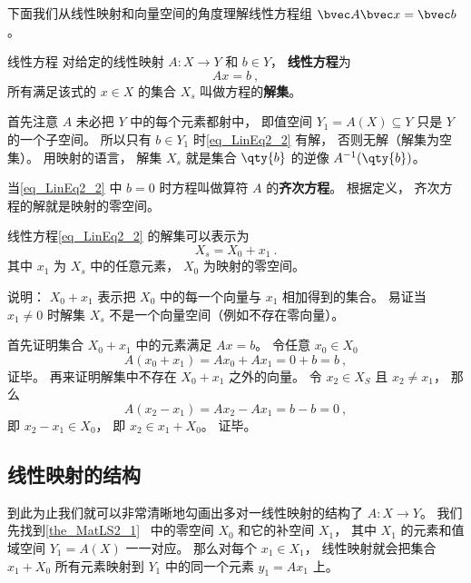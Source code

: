 
\begin{issues}
\issueDraft
\end{issues}


下面我们从线性映射和向量空间的角度理解线性方程组 $\bvec A \bvec x = \bvec b$。


\begin{definition}{线性方程}
对给定的线性映射 $A:X\to Y$ 和 $b \in Y$， \textbf{线性方程}为
\begin{equation}\label{eq_LinEq2_2}
Ax = b~,
\end{equation}
所有满足该式的 $x \in X$ 的集合 $X_s$ 叫做方程的\textbf{解集}。
\end{definition}

首先注意 $A$ 未必把 $Y$ 中的每个元素都射中， 即值空间 $Y_1 = A(X) \subseteq Y$ 只是 $Y$ 的一个子空间。 所以只有 $b \in Y_1$ 时\autoref{eq_LinEq2_2} 有解， 否则无解（解集为空集）。 用映射的语言， 解集 $X_s$ 就是集合 $\qty{b}$ 的逆像 $A^{-1}(\qty{b})$。

当\autoref{eq_LinEq2_2} 中 $b = 0$ 时方程叫做算符 $A$ 的\textbf{齐次方程}。 根据定义， 齐次方程的解就是映射的零空间。


\begin{theorem}{}\label{the_LinEq2_1}
线性方程\autoref{eq_LinEq2_2} 的解集可以表示为
\begin{equation}\label{eq_LinEq2_1}
X_s = X_0 + x_1~.
\end{equation}
其中 $x_1$ 为 $X_s$ 中的任意元素，  $X_0$ 为映射的零空间。
\end{theorem}
说明： $X_0 + x_1$ 表示把 $X_0$ 中的每一个向量与 $x_1$ 相加得到的集合。 易证当 $x_1 \ne 0$ 时解集 $X_s$ 不是一个向量空间（例如不存在零向量）。

首先证明集合 $X_0 + x_1$ 中的元素满足 $Ax = b$。 令任意 $x_0 \in X_0$
\begin{equation}
A(x_0 + x_1) = Ax_0 + Ax_1 = 0 + b = b~,
\end{equation}
证毕。 再来证明解集中不存在 $X_0 + x_1$ 之外的向量。 令 $x_2 \in X_S$ 且 $x_2 \ne x_1$， 那么
\begin{equation}
A(x_2 - x_1) = Ax_2 - Ax_1 = b - b = 0~,
\end{equation}
即 $x_2 - x_1 \in X_0$， 即 $x_2 \in x_1 + X_0$。 证毕。

\subsection{线性映射的结构}
到此为止我们就可以非常清晰地勾画出多对一线性映射的结构了 $A:X\to Y$。 我们先找到\autoref{the_MatLS2_1}~ 中的零空间 $X_0$ 和它的补空间 $X_1$， 其中 $X_1$ 的元素和值域空间 $Y_1 = A(X)$ 一一对应。 那么对每个 $x_1 \in X_1$， 线性映射就会把集合 $x_1 + X_0$ 所有元素映射到 $Y_1$ 中的同一个元素 $y_1 = Ax_1$ 上。

